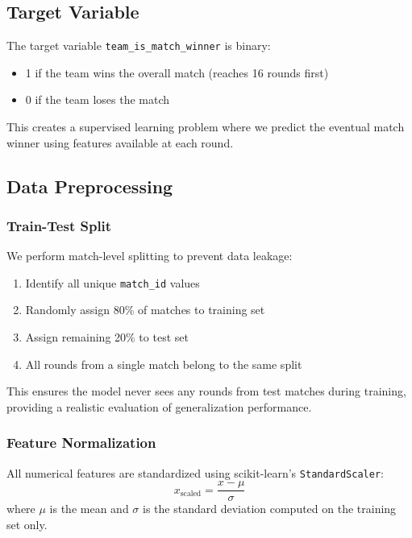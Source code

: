 \documentclass[11pt]{article}
\begin{document}
\subsection{Target Variable}

The target variable \texttt{team\_is\_match\_winner} is binary:
\begin{itemize}
    \item 1 if the team wins the overall match (reaches 16 rounds first)
    \item 0 if the team loses the match
\end{itemize}

This creates a supervised learning problem where we predict the eventual match winner using features available at each round.

\subsection{Data Preprocessing}

\subsubsection{Train-Test Split}

We perform match-level splitting to prevent data leakage:
\begin{enumerate}
    \item Identify all unique \texttt{match\_id} values
    \item Randomly assign 80\% of matches to training set
    \item Assign remaining 20\% to test set
    \item All rounds from a single match belong to the same split
\end{enumerate}

This ensures the model never sees any rounds from test matches during training, providing a realistic evaluation of generalization performance.

\subsubsection{Feature Normalization}

All numerical features are standardized using scikit-learn's \texttt{StandardScaler}:
\begin{equation}
x_{\text{scaled}} = \frac{x - \mu}{\sigma}
\end{equation}
where $\mu$ is the mean and $\sigma$ is the standard deviation computed on the training set only.
\end{document}
